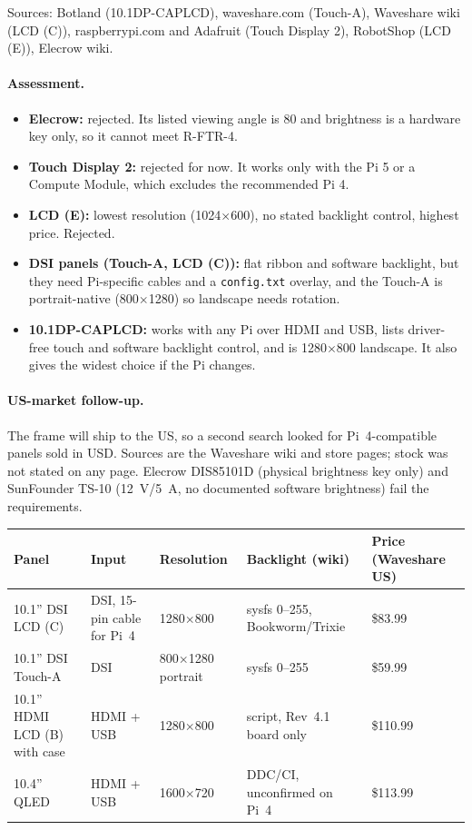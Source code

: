 \documentclass[11pt,a4paper]{article}
\begin{document}
Sources: Botland (10.1DP-CAPLCD), waveshare.com (Touch-A), Waveshare wiki (LCD (C)), raspberrypi.com and Adafruit (Touch Display 2), RobotShop (LCD (E)), Elecrow wiki.

\paragraph{Assessment.}
\begin{itemize}
  \item \textbf{Elecrow:} rejected. Its listed viewing angle is 80\textdegree{} and brightness is a hardware key only, so it cannot meet R-FTR-4.
  \item \textbf{Touch Display 2:} rejected for now. It works only with the Pi 5 or a Compute Module, which excludes the recommended Pi 4.
  \item \textbf{LCD (E):} lowest resolution (1024$\times$600), no stated backlight control, highest price. Rejected.
  \item \textbf{DSI panels (Touch-A, LCD (C)):} flat ribbon and software backlight, but they need Pi-specific cables and a \texttt{config.txt} overlay, and the Touch-A is portrait-native (800$\times$1280) so landscape needs rotation.
  \item \textbf{10.1DP-CAPLCD:} works with any Pi over HDMI and USB, lists driver-free touch and software backlight control, and is 1280$\times$800 landscape. It also gives the widest choice if the Pi changes.
\end{itemize}

\paragraph{US-market follow-up.}
The frame will ship to the US, so a second search looked for Pi~4-compatible panels sold in USD. Sources are the Waveshare wiki and store pages; stock was not stated on any page. Elecrow DIS85101D (physical brightness key only) and SunFounder TS-10 (12~V/5~A, no documented software brightness) fail the requirements.

\begin{longtable}{p{3.4cm} p{1.6cm} p{2.3cm} p{3.2cm} p{1.7cm}}
\toprule
\textbf{Panel} & \textbf{Input} & \textbf{Resolution} & \textbf{Backlight (wiki)} & \textbf{Price (Waveshare US)} \\
\midrule\endhead
10.1'' DSI LCD (C) & DSI, 15-pin cable for Pi~4 & 1280$\times$800 & sysfs 0--255, Bookworm/Trixie & \$83.99 \\
10.1'' DSI Touch-A & DSI & 800$\times$1280 portrait & sysfs 0--255 & \$59.99 \\
10.1'' HDMI LCD (B) with case & HDMI + USB & 1280$\times$800 & script, Rev~4.1 board only & \$110.99 \\
10.4'' QLED & HDMI + USB & 1600$\times$720 & DDC/CI, unconfirmed on Pi~4 & \$113.99 \\
\bottomrule
\end{longtable}
\end{document}
